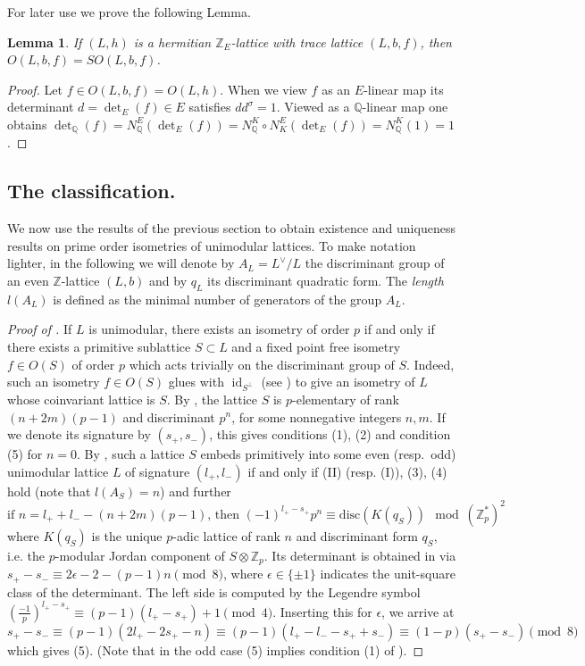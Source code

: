 \documentclass{amsart}
\theoremstyle{definition}
\theoremstyle{plain}
\newtheorem{lemma}[definition]{Lemma}
\DeclareMathOperator{\id}{id}
\newcommand{\QQ}{\mathbb{Q}}
\newcommand{\ZZ}{\mathbb{Z}}
\begin{document}
For later use we prove the following Lemma.
\begin{lemma}\label{lem:SO}
 If $(L,h)$ is a hermitian $\ZZ_E$-lattice with trace lattice $(L,b,f)$, then $O(L,b,f)=SO(L,b,f)$.
\end{lemma}
\begin{proof}
 Let $f \in O(L,b,f)=O(L,h)$. When we view $f$ as an $E$-linear map its determinant $d=\det_E(f) \in E$ satisfies $dd^\sigma=1$. Viewed as a $\QQ$-linear map one obtains $\det_\QQ(f)=N^E_\QQ(\det_E(f))=N^K_\QQ\circ N^E_K(\det_E(f))=N^K_\QQ(1)=1$.
\end{proof}

\subsection{The classification.}
We now use the results of the previous section to obtain
existence and uniqueness results on prime order isometries of unimodular lattices. To make notation lighter, in the following we will denote by $A_L = L^\vee/L$ the discriminant group of an even $\ZZ$-lattice $(L,b)$ and by $q_L$ its discriminant quadratic form. The \emph{length} $l(A_L)$ is defined as the minimal number of generators of the group $A_L$.

\begin{proof}[Proof of ]
If $L$ is unimodular, there exists an isometry
of order $p$ if and only if there exists a primitive sublattice
$S \subset L$ and a fixed point free isometry $f \in O(S)$ of order $p$
which acts trivially on the discriminant group of $S$.
Indeed, such an isometry $f \in O(S)$ glues with $\id_{S^\perp}$
(see \cite[Cor.\ 1.5.2]{nikulin}) to give an isometry of $L$
whose coinvariant lattice is $S$. By ,
the lattice $S$ is $p$-elementary of rank $(n+2m)(p-1)$ and
discriminant $p^n$, for some nonnegative integers $n,m$.
If we denote its signature by $(s_+,s_-)$, this gives
conditions (1), (2) and condition (5) for $n=0$.
By \cite[Thm.\ 1.12.2 (resp.\ 1.16.5)]{nikulin}, such a lattice $S$ embeds
primitively into some even (resp.\ odd) unimodular lattice
$L$ of signature $(l_+,l_-)$ if and only if (II) (resp. (I)), (3), (4) hold
(note that $l(A_S)=n$) and further
\[\text{if } n = l_+ + l_- - (n+2m)(p-1) \text{, then }
(-1)^{l_+ - s_+}p^n \equiv \text{disc}(K(q_S)) \mod \left( \ZZ_p^*\right)^2\]
where $K(q_S)$ is the unique $p$-adic lattice of rank $n$
and discriminant form $q_S$, i.e. the $p$-modular Jordan
component of $S \otimes \ZZ_p$. Its determinant is obtained
in 
via $s_+ - s_- \equiv 2\epsilon  -2 - (p-1)n \pmod{8}$,
where $\epsilon \in \{\pm 1\}$ indicates
the unit-square class of the determinant.
The left side is computed by the Legendre symbol $\left(\frac{-1}{p}\right)^{l_+ - s_+} \equiv (p-1)(l_+-s_+) +1 \pmod{4}$. Inserting this for $\epsilon$, we arrive at
\[s_+ - s_- \equiv (p-1)(2l_+ - 2s_+ -n) \equiv (p-1)(l_+ - l_- - s_+ + s_-) \equiv (1-p)(s_+ - s_-)\pmod{8}\]
which gives (5). (Note that in the odd case (5) implies condition (1) of \cite[Thm 1.16.5]{nikulin}).
\end{proof}
\end{document}
